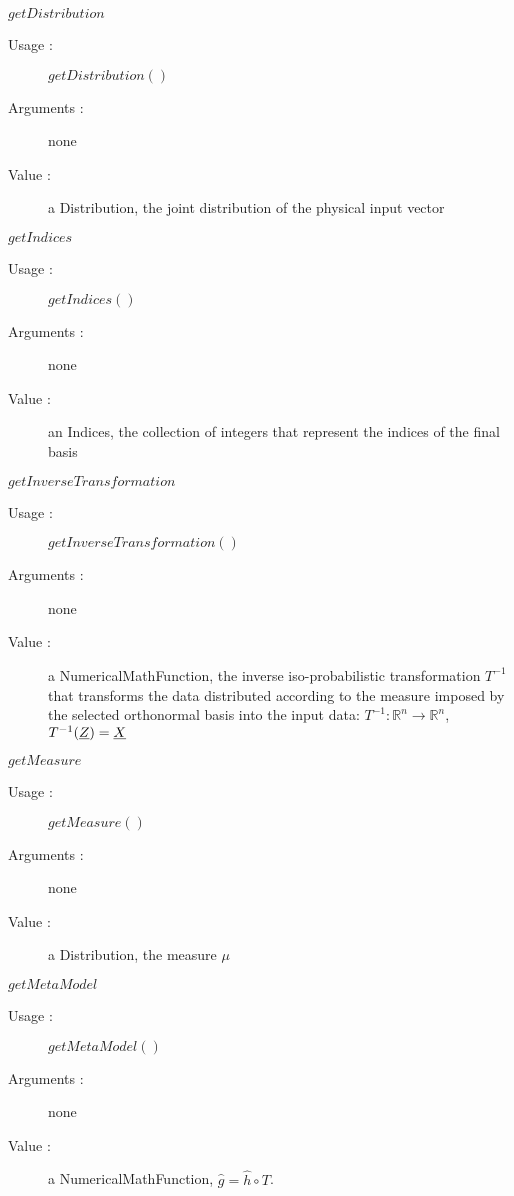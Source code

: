 \begin{description}
\begin{description}
  \item $getDistribution$
    \begin{description}
    \item[Usage :] $getDistribution()$
    \item[Arguments :] none
    \item[Value :] a Distribution, the joint distribution of the physical input vector
    \end{description}
    \bigskip

  \item $getIndices$
    \begin{description}
    \item[Usage :] $getIndices()$
    \item[Arguments :] none
    \item[Value :] an Indices, the collection of integers that represent the indices of the final basis
    \end{description}
    \bigskip


  \item $getInverseTransformation$
    \begin{description}
    \item[Usage :] $getInverseTransformation()$
    \item[Arguments :] none
    \item[Value :] a NumericalMathFunction, the inverse iso-probabilistic transformation $T^{-1}$ that transforms the data distributed according to the measure imposed by the selected orthonormal basis into the input data: $T^{-1} : \mathbb{R}^n \longrightarrow\mathbb{R}^n $, $T^{-1}({\underline{Z}}) = {\underline{X}}$
    \end{description}
    \bigskip

  \item $getMeasure$
    \begin{description}
    \item[Usage :] $getMeasure()$
    \item[Arguments :] none
    \item[Value :] a Distribution, the measure $\mu$ 
    \end{description}
    \bigskip

  \item $getMetaModel$
    \begin{description}
    \item[Usage :] $getMetaModel()$
    \item[Arguments :] none
    \item[Value :] a NumericalMathFunction,  $\hat{g}  = \hat{h} \circ T$.
    \end{description}
    \bigskip


\end{description}
\end{description}
